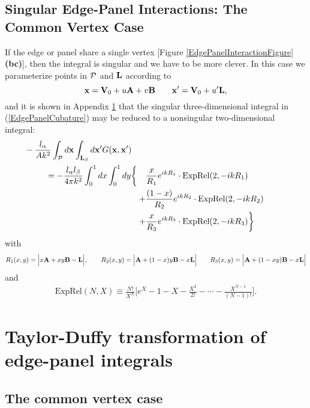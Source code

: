 \documentclass[letterpaper]{article}
\begin{document}
\subsection*{Singular Edge-Panel Interactions: The Common Vertex Case}

If the edge or panel share a single vertex 
[Figure \ref{EdgePanelInteractionFigure}\textbf{(bc)}],
then the integral is singular and we have to be more clever.
In this case we parameterize points in $\mathcal{P}$ and $\mathbf{L}$ 
according to
$$ \mathbf{x} = \mathbf{V}_0 + u\mathbf{A} + v\mathbf{B}
   \qquad
   \mathbf{x}^\prime = \mathbf{V}_0 + u^\prime \mathbf{L},
$$
and it is shown in Appendix \ref{EdgePanelAppendix}
that the singular three-dimensional integral in (\ref{EdgePanelCubature})
may be reduced to a nonsingular two-dimensional integral:
\begin{align}
&\hspace{-2in}
 -\frac{l_\alpha}{Ak^2}
   \int_{\pan} d\vb x \int_{\vb L_\beta} d\vb x^\prime
   G(\vb x, \vb x^\prime)
\\
 =
 -\frac{l_\alpha l_\beta}{4\pi k^2}\int_0^1 dx \int_0^1 dy \bigg\{
 \quad &\frac{x}{R_1} e^{ikR_1} \cdot \text{ExpRel}(2,-ikR_1)
\\
      +&\frac{(1-x)}{R_2} e^{ikR_2} \cdot \text{ExpRel}(2,-ikR_2)
\\
      +&\frac{x}{R_3}e^{ikR_3} \cdot \text{ExpRel}(2,-ikR_3)
  \bigg\}
\end{align}
with
$$ R_1(x,y)=\Big| x\mathbf{A} + xy \mathbf{B} - \mathbf{L} \Big|,
   \qquad
   R_2(x,y)=\Big| \mathbf{A} + (1-x)y \mathbf{B} - x\mathbf{L}\Big|
   \qquad
   R_3(x,y)=\Big| \mathbf{A} + (1-xy) \mathbf{B} - x\mathbf{L}\Big|
$$
and
\begin{align*}
 \text{ExpRel}(N,X) \equiv
 \frac{N!}{X^N}\Big[e^{X} - 1 - X - \frac{X^2}{2!} - \cdots 
                             - \frac{X^{N-1}}{(N-1)!} \Big].
\end{align*}

\appendix
\newpage
\section{Taylor-Duffy transformation of edge-panel integrals}
\label{EdgePanelAppendix}

\subsection{The common vertex case}
\end{document}
